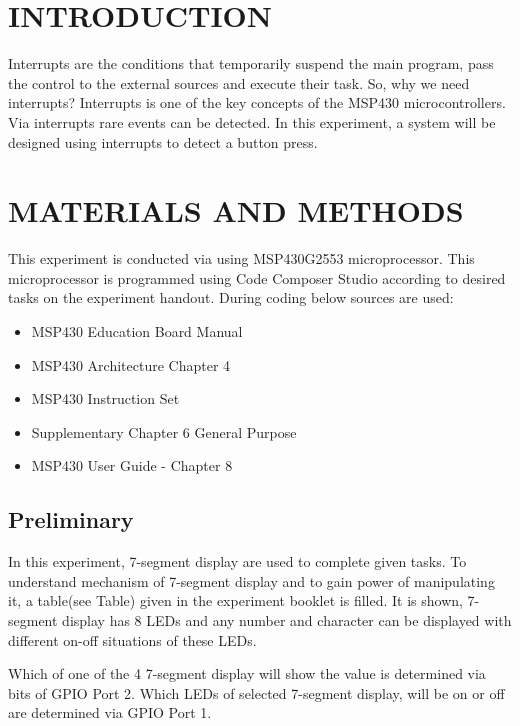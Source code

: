 \documentclass[pdftex,12pt,a4paper]{article}
\begin{document}
\section{INTRODUCTION}

Interrupts are the conditions that temporarily suspend the main program, pass the control to the external sources and execute their task. So, why we need interrupts? Interrupts is one of the key concepts of the MSP430 microcontrollers. Via interrupts rare events can be detected. In this experiment, a system will be designed using interrupts to detect a button press.

\section{MATERIALS AND METHODS}

This experiment is conducted via using MSP430G2553 microprocessor. This microprocessor is programmed using Code Composer Studio according to desired tasks on the experiment handout. During coding below sources are used:

\begin{itemize}
    \item MSP430 Education Board Manual \cite{ref2}
    \item MSP430 Architecture Chapter 4 \cite{ref3}
    \item MSP430 Instruction Set \cite{ref4}
    \item Supplementary Chapter 6 General Purpose \cite{ref5}
    \item MSP430 User Guide - Chapter 8 \cite{ref5}
\end{itemize}

\subsection{Preliminary}
\newline
In this experiment, 7-segment display are used to complete given tasks. To understand mechanism of 7-segment display and to gain power of manipulating it, a table(see Table) given in the experiment booklet is filled. It is shown, 7-segment display has 8 LEDs and any number and character can be displayed with different on-off situations of these LEDs.

\newline
Which of one of the 4 7-segment display will show the value is determined via bits of GPIO Port 2. Which LEDs of selected 7-segment display,  will be on or off are determined via GPIO Port 1.
\end{document}
